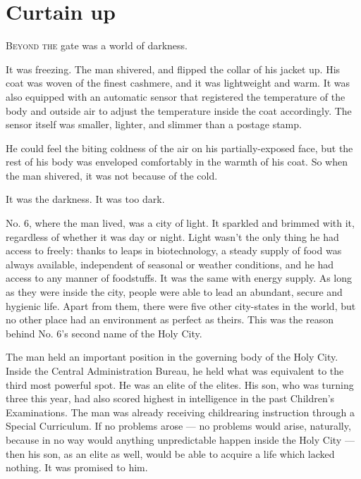 
\chapter{Curtain up}


\lettrine{B}{eyond the} gate was a world of darkness.

It was freezing. The man shivered, and flipped the collar of his jacket
up. His coat was woven of the finest cashmere, and it was lightweight
and warm. It was also equipped with an automatic sensor that registered
the temperature of the body and outside air to adjust the temperature
inside the coat accordingly. The sensor itself was smaller, lighter, and
slimmer than a postage stamp.

He could feel the biting coldness of the air on his partially-exposed
face, but the rest of his body was enveloped comfortably in the warmth
of his coat. So when the man shivered, it was not because of the cold.

It was the darkness. It was too dark.

No. 6, where the man lived, was a city of light. It sparkled and brimmed
with it, regardless of whether it was day or night. Light wasn't the
only thing he had access to freely: thanks to leaps in biotechnology, a
steady supply of food was always available, independent of seasonal or
weather conditions, and he had access to any manner of foodstuffs. It
was the same with energy supply. As long as they were inside the city,
people were able to lead an abundant, secure and hygienic life. Apart
from them, there were five other city-states in the world, but no other
place had an environment as perfect as theirs. This was the reason
behind No. 6's second name of the Holy City.

The man held an important position in the governing body of the Holy
City. Inside the Central Administration Bureau, he held what was
equivalent to the third most powerful spot. He was an elite of the
elites. His son, who was turning three this year, had also scored
highest in intelligence in the past Children's Examinations. The man was
already receiving childrearing instruction through a Special Curriculum.
If no problems arose --- no problems would arise, naturally, because in no
way would anything unpredictable happen inside the Holy City --- then his
son, as an elite as well, would be able to acquire a life which lacked
nothing. It was promised to him.

